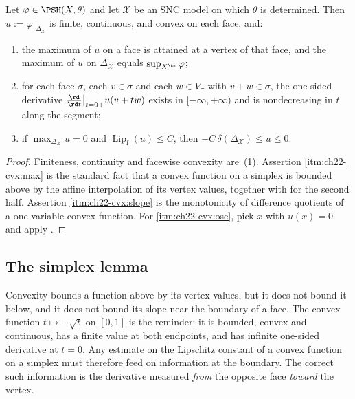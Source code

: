 \begin{lemma}
\label{lem:ch22-convexity-consequences}
Let $\varphi\in\PSH(X,\theta)$ and let $\mathcal X$ be an SNC model on
which $\theta$ is determined.  Then
$u:=\varphi|_{\Delta_{\mathcal X}}$ is finite, continuous, and convex on
each face, and:
\begin{enumerate}
\item\label{itm:ch22-cvx:max} the maximum of $u$ on a face is attained at
a vertex of that face, and the maximum of $u$ on
$\Delta_{\mathcal X}$ equals $\sup_{X^{\An}}\varphi$;
\item\label{itm:ch22-cvx:slope} for each face $\sigma$, each
$v\in\sigma$ and each $w\in V_\sigma$ with $v+w\in\sigma$, the
one-sided derivative
$\frac{\rd}{\rd t}\big|_{t=0+}u(v+tw)$ exists in
$[-\infty,+\infty)$ and is nondecreasing in $t$ along the segment;
\item\label{itm:ch22-cvx:osc} if $\max_{\Delta_{\mathcal X}}u=0$ and
$\operatorname{Lip}_{\mathrm f}(u)\leq C$, then
$-C\,\delta(\Delta_{\mathcal X})\leq u\leq0$.
\end{enumerate}
\end{lemma}

\begin{proof}
Finiteness, continuity and facewise convexity are
\,(1).  Assertion
\cref{itm:ch22-cvx:max} is the standard fact that a convex function on a
simplex is bounded above by the affine interpolation of its vertex values,
together with  for the second half.
Assertion \cref{itm:ch22-cvx:slope} is the monotonicity of difference
quotients of a one-variable convex function.  For
\cref{itm:ch22-cvx:osc}, pick $x$ with $u(x)=0$ and apply
.
\end{proof}

\subsection{The simplex lemma}

Convexity bounds a function above by its vertex values, but it does not
bound it below, and it does not bound its slope near the boundary of a face.
The convex function $t\mapsto-\sqrt t$ on $[0,1]$ is the reminder: it is
bounded, convex and continuous, has a finite value at both endpoints, and
has infinite one-sided derivative at $t=0$.  Any estimate on the Lipschitz
constant of a convex function on a simplex must therefore feed on
information at the boundary.  The correct such information is the
derivative measured \emph{from} the opposite face \emph{toward} the vertex.

